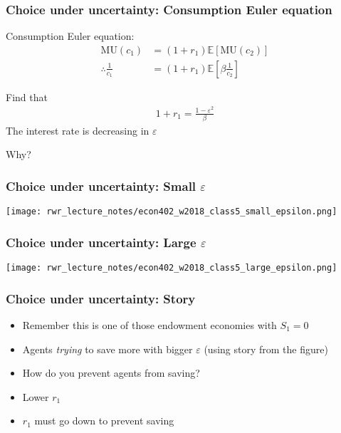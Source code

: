 \documentclass[presentation,dvipsnames]{beamer}
\begin{document}
\begin{frame}
\frametitle{Choice under uncertainty: Consumption Euler equation}
Consumption Euler equation:
\begin{align*}
\text{MU}(c_{1}) &= (1+r_{1}) \mathbb{E} \left[ \text{MU}(c_{2}) \right] \\
\therefore \frac{1}{c_{1}} &= (1+r_{1}) \mathbb{E} \left[ \beta \frac{1}{c_{2}} \right]
\end{align*}

Find that
\begin{align*}
1+r_{1} = \frac{1-\varepsilon^{2}}{\beta}
\end{align*}
\textcolor{RubineRed}{The interest rate is decreasing in $\varepsilon$}

\vspace{1em}

Why?
\end{frame}

\begin{frame}
\frametitle{Choice under uncertainty: Small $\varepsilon$}
\centerline{\texttt{[image: rwr\_lecture\_notes/econ402\_w2018\_class5\_small\_epsilon.png]}}
\end{frame}

\begin{frame}
\frametitle{Choice under uncertainty: Large $\varepsilon$}
\centerline{\texttt{[image: rwr\_lecture\_notes/econ402\_w2018\_class5\_large\_epsilon.png]}}
\end{frame}

\begin{frame}
\frametitle{Choice under uncertainty: Story}
\begin{itemize}[label={--}]
\item Remember this is one of those endowment economies with $S_{1} = 0$
\item Agents \emph{trying} to save more with bigger $\varepsilon$ (using story from the figure)
\item How do you prevent agents from saving?
\item Lower $r_{1}$
\item $r_{1}$ must go down to prevent saving
\end{itemize}
\end{frame}

\end{document}
